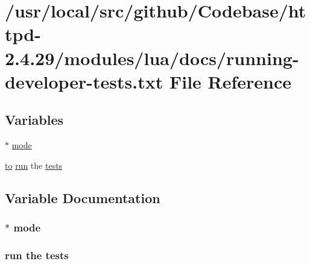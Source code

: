 \hypertarget{running-developer-tests_8txt}{}\section{/usr/local/src/github/\+Codebase/httpd-\/2.4.29/modules/lua/docs/running-\/developer-\/tests.txt File Reference}
\label{running-developer-tests_8txt}
\subsection*{Variables}
\begin{DoxyCompactItemize}
\item 
$\ast$ \hyperlink{running-developer-tests_8txt_a9bd2d652c410191f1677cf3e433fc8de}{mode}
\item 
\hyperlink{pcretest_8txt_aa22c98f630e4b3fe86ee17ce5150c62f}{to} \hyperlink{pcretest_8txt_a5a989107465910839d799cefcea80d85}{run} the \hyperlink{running-developer-tests_8txt_ae0edb32d329db43bf8a0513c0967e5b9}{tests}
\end{DoxyCompactItemize}


\subsection{Variable Documentation}
\subsubsection[{\texorpdfstring{mode}{mode}}]{\setlength{\rightskip}{0pt plus 5cm}$\ast$ mode}\hypertarget{running-developer-tests_8txt_a9bd2d652c410191f1677cf3e433fc8de}{}\label{running-developer-tests_8txt_a9bd2d652c410191f1677cf3e433fc8de}
\subsubsection[{\texorpdfstring{tests}{tests}}]{ {\bf run} the tests}\hypertarget{running-developer-tests_8txt_ae0edb32d329db43bf8a0513c0967e5b9}{}\label{running-developer-tests_8txt_ae0edb32d329db43bf8a0513c0967e5b9}
